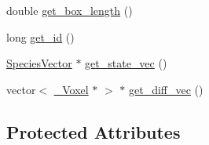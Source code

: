 \begin{DoxyCompactItemize}
\item 
double \hyperlink{classnw_1_1___voxel_a836eab78d769eae2b732335a91d84148}{get\+\_\+box\+\_\+length} ()
\item 
long \hyperlink{classnw_1_1___voxel_a0336ad5b120b40c4ad3f0012f50def1b}{get\+\_\+id} ()
\item 
\hyperlink{namespacenw_a68aa8285591d78ebfc793c531bd43a23}{Species\+Vector} $\ast$ \hyperlink{classnw_1_1___voxel_a91f1d799645722bf5fe15c34137433b1}{get\+\_\+state\+\_\+vec} ()
\item 
vector$<$ \hyperlink{classnw_1_1___voxel}{\+\_\+\+Voxel} $\ast$ $>$ $\ast$ \hyperlink{classnw_1_1___voxel_a688c8c9ca0a3a533e557a800d9f3b511}{get\+\_\+diff\+\_\+vec} ()
\end{DoxyCompactItemize}
\subsection*{Protected Attributes}
